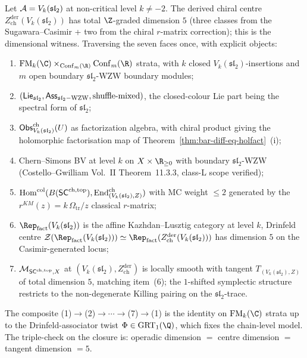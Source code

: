 \begin{remark}\label{rem:heptagon-witness-vk-sl2}%
Let $\mathcal{A}=V_k(\mathfrak{sl}_2)$ at non-critical level $k\neq -2$. The derived
chiral centre $Z^{\mathrm{der}}_{\mathrm{ch}}(V_k(\mathfrak{sl}_2))$ has total
$\Z$-graded dimension $5$ (three classes from the
Sugawara--Casimir + two from the chiral $r$-matrix correction);
this is the dimensional witness. Traversing the seven faces
once, with explicit objects:
\begin{enumerate}[label=\textup{(\arabic*)}]
\item $\FM_k(\C)\times_{\Conf_m(\R)}\Conf_m(\R)$ strata, with
$k$ closed $V_k(\mathfrak{sl}_2)$-insertions and $m$ open boundary $\mathfrak{sl}_2$-WZW
boundary modules;
\item $(\mathsf{Lie}_{\mathfrak{sl}_2},\mathsf{Ass}_{\mathfrak{sl}_2-\mathrm{WZW}},\text{shuffle-mixed})$,
the closed-colour Lie part being the spectral form of $\mathfrak{sl}_2$;
\item $\mathsf{Obs}^{\mathrm{ch}}_{V_k(\mathfrak{sl}_2)}(U)$ as factorization
algebra, with chiral product giving the
holomorphic factorisation map of
Theorem~\ref{thm:bar-diff-eq-holfact}~(i);
\item Chern--Simons BV at level $k$ on $X\times\R_{\geq 0}$ with
boundary $\mathfrak{sl}_2$-WZW (Costello--Gwilliam Vol.~II Theorem~11.3.3,
class-L scope verified);
\item $\mathrm{Hom}^{\mathrm{col}}(B(\mathsf{SC}^{\mathrm{ch},\mathrm{top}}),
\mathrm{End}^{\mathrm{ch}}_{(V_k(\mathfrak{sl}_2),Z)})$ with MC weight $\leq 2$
generated by the $r^{KM}(z)=k\,\Omega_{\mathrm{tr}}/z$ classical $r$-matrix;
\item $\Rep_{\mathrm{fact}}(V_k(\mathfrak{sl}_2))$ is the affine
Kazhdan--Lusztig category at level $k$, Drinfeld centre
$\cZ(\Rep_{\mathrm{fact}}(V_k(\mathfrak{sl}_2)))\simeq\Rep_{\mathrm{fact}}(
Z^{\mathrm{der}}_{\mathrm{ch}}(V_k(\mathfrak{sl}_2)))$ has dimension $5$ on the
Casimir-generated locus;
\item $\mathcal{M}_{\mathsf{SC}^{\mathrm{ch},\mathrm{top}},X}$ at $(V_k(\mathfrak{sl}_2),Z^{\mathrm{der}}_{\mathrm{ch}})$
is locally smooth with tangent $T_{(V_k(\mathfrak{sl}_2),Z)}$ of total dimension
$5$, matching item~(6); the $1$-shifted symplectic structure
restricts to the non-degenerate Killing pairing on the
$\mathfrak{sl}_2$-trace.
\end{enumerate}
The composite (1)$\to$(2)$\to\cdots\to$(7)$\to$(1) is the identity on
$\FM_k(\C)$ strata up to the Drinfeld-associator twist
$\Phi\in\mathrm{GRT}_1(\Q)$, which fixes the chain-level model. The
triple-check on the closure is: operadic dimension $=$
centre dimension $=$ tangent dimension $=5$.
\end{remark}

